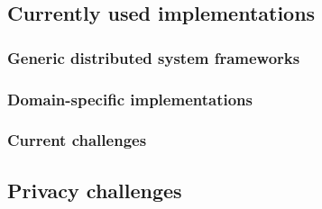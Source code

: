\subsection{Currently used implementations}
\subsubsection{Generic distributed system frameworks}
\subsubsection{Domain-specific implementations}
\subsubsection{Current challenges}










\subsection{Privacy challenges}
